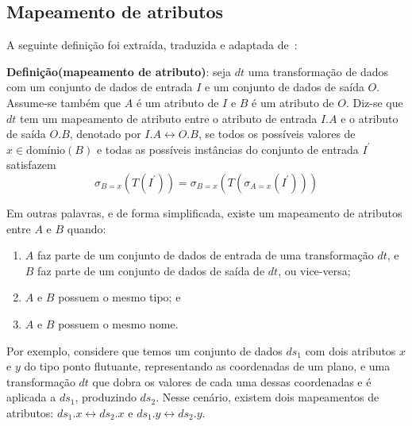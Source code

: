 \subsection{Mapeamento de atributos}%
\label{subsec:mapeamento-de-atributos}

A seguinte definição foi extraída, traduzida e adaptada de~\cite{ikeda2013logical}:

\textbf{Definição(mapeamento de atributo)}: seja \( dt \) uma transformação de dados com um conjunto de dados de entrada \( I \) e um conjunto de dados de saída \( O \). Assume-se também que \( A \) é um atributo de \( I \) e \( B \) é um atributo de \( O \). Diz-se que \( dt \) tem um mapeamento de atributo entre o atributo de entrada \( I.A \) e o atributo de saída \( O.B \), denotado por \( I.A \leftrightarrow O.B \), se todos os possíveis valores de \( x \in \textrm{domínio}(B) \) e todas as possíveis instâncias do conjunto de entrada \( I^{\prime} \) satisfazem
\[ \sigma_{B=x}(T(I^{\prime})) = \sigma_{B=x}(T(\sigma_{A=x}(I^{\prime}))) \]

Em outras palavras, e de forma simplificada, existe um mapeamento de atributos entre \( A \) e \( B \) quando:

\begin{enumerate}
    \item \( A \) faz parte de um conjunto de dados de entrada de uma transformação \( dt \), e \( B \) faz parte de um conjunto de dados de saída de \( dt \), ou vice-versa;
    \item \( A \) e \( B \) possuem o mesmo tipo; e
    \item \( A \) e \( B \) possuem o mesmo nome.
\end{enumerate}

Por exemplo, considere que temos um conjunto de dados \( ds_{1} \) com dois atributos \( x \) e \( y \) do tipo ponto flutuante, representando as coordenadas de um plano, e uma transformação \( dt \) que dobra os valores de cada uma dessas coordenadas e é aplicada a \( ds_{1} \), produzindo \( ds_{2} \). Nesse cenário, existem dois mapeamentos de atributos: \( ds_{1}.x \leftrightarrow ds_{2}.x \) e \( ds_{1}.y \leftrightarrow ds_{2}.y \).
